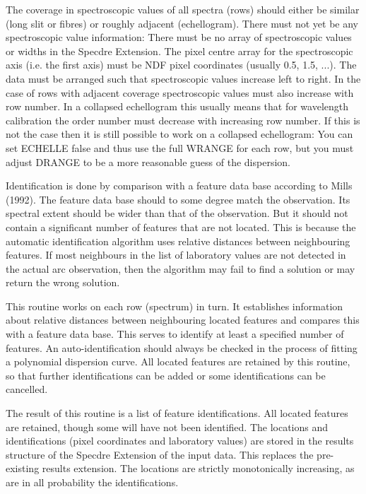 \begin{description}
\begin{terminalv}
   The coverage in spectroscopic values of all spectra (rows) should
   either be similar (long slit or fibres) or roughly adjacent
   (echellogram). There must not yet be any spectroscopic value
   information: There must be no array of spectroscopic values or
   widths in the Specdre Extension. The pixel centre array for the
   spectroscopic axis (i.e. the first axis) must be NDF pixel
   coordinates (usually 0.5, 1.5, ...). The data must be arranged
   such that spectroscopic values increase left to right. In the case
   of rows with adjacent coverage spectroscopic values must also
   increase with row number. In a collapsed echellogram this usually
   means that for wavelength calibration the order number must
   decrease with increasing row number. If this is not the case then
   it is still possible to work on a collapsed echellogram: You can
   set ECHELLE false and thus use the full WRANGE for each row, but
   you must adjust DRANGE to be a more reasonable guess of the
   dispersion.

   Identification is done by comparison with a feature data base
   according to Mills (1992). The feature data base should to some
   degree match the observation. Its spectral extent should be wider
   than that of the observation. But it should not contain a
   significant number of features that are not located. This is
   because the automatic identification algorithm uses relative
   distances between neighbouring features. If most neighbours in the
   list of laboratory values are not detected in the actual arc
   observation, then the algorithm may fail to find a solution or may
   return the wrong solution.

   This routine works on each row (spectrum) in turn. It establishes
   information about relative distances between neighbouring located
   features and compares this with a feature data base. This serves
   to identify at least a specified number of features. An
   auto-identification should always be checked in the process of
   fitting a polynomial dispersion curve. All located features are
   retained by this routine, so that further identifications can be
   added or some identifications can be cancelled.

   The result of this routine is a list of feature identifications.
   All located features are retained, though some will have not been
   identified. The locations and identifications (pixel coordinates
   and laboratory values) are stored in the results structure of the
   Specdre Extension of the input data. This replaces the
   pre-existing results extension. The locations are strictly
   monotonically increasing, as are in all probability the
   identifications.


\end{terminalv}
\end{description}

